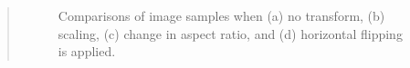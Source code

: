 \documentclass[11pt]{article}
\begin{document}
\begin{quote}
\begin{figure}[h]
    \centering
    \caption{Comparisons of image samples when (a) no transform, (b) scaling, (c) change in aspect ratio, and (d) horizontal flipping is applied.}
    \label{fig:transform}
\end{figure}


\end{quote}
\end{document}
